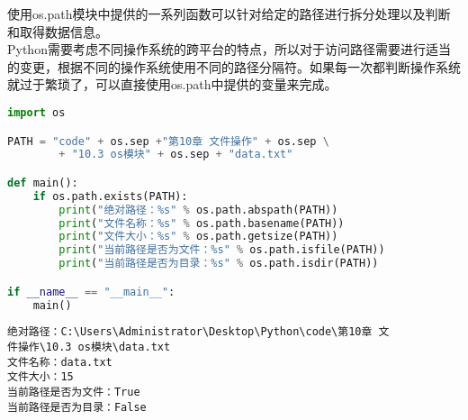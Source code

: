使用os.path模块中提供的一系列函数可以针对给定的路径进行拆分处理以及判断和取得数据信息。\\

Python需要考虑不同操作系统的跨平台的特点，所以对于访问路径需要进行适当的变更，根据不同的操作系统使用不同的路径分隔符。如果每一次都判断操作系统就过于繁琐了，可以直接使用os.path中提供的变量来完成。

\begin{table}[H]
	\centering
	\caption{路径分隔符}
\end{table}

\vspace{0.5cm}


\begin{lstlisting}[language=Python]
import os

PATH = "code" + os.sep +"第10章 文件操作" + os.sep \
        + "10.3 os模块" + os.sep + "data.txt"

def main():
    if os.path.exists(PATH):
        print("绝对路径：%s" % os.path.abspath(PATH))
        print("文件名称：%s" % os.path.basename(PATH))
        print("文件大小：%s" % os.path.getsize(PATH))
        print("当前路径是否为文件：%s" % os.path.isfile(PATH))
        print("当前路径是否为目录：%s" % os.path.isdir(PATH))

if __name__ == "__main__":
    main()
\end{lstlisting}

\begin{tcolorbox}
	\begin{verbatim}
绝对路径：C:\Users\Administrator\Desktop\Python\code\第10章 文
件操作\10.3 os模块\data.txt
文件名称：data.txt
文件大小：15
当前路径是否为文件：True
当前路径是否为目录：False
\end{verbatim}
\end{tcolorbox}

